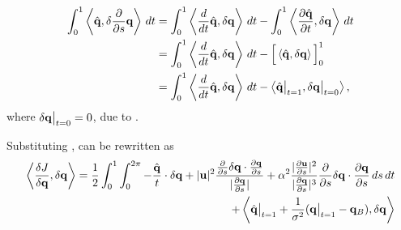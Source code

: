 \documentclass[a4paper, 12pt]{article}
\begin{document}
\begin{equation}
\begin{split}
  \label{eq:adjoint}
  \int^1_0\left\langle \hat{\mathbf{q}}, \delta \frac{\partial }{\partial s} \mathbf{q} \right\rangle\,dt &=  
  \int^1_0\left\langle \frac{d}{dt}\hat{\mathbf{q}}, \delta \mathbf{q} \right\rangle\,dt -  \int^1_0\left\langle \frac{\partial \hat{\mathbf{q}}}{\partial t}, \delta \mathbf{q}  \right\rangle\,dt  \\
  &= \int^1_0\left\langle \frac{d}{dt}\hat{\mathbf{q}}, \delta \mathbf{q} \right\rangle\,dt - \Big[\left\langle \hat{\mathbf{q}}, \delta \mathbf{q} \right\rangle\Big]^1_0  \\
  &= \int^1_0\left\langle \frac{d}{dt}\hat{\mathbf{q}}, \delta \mathbf{q} \right\rangle\,dt - \left\langle \hat{\mathbf{q}}\big|_{t=1}, \delta \mathbf{q}\big|_{t=0} \right\rangle,
\end{split}
\end{equation}
where $\delta \mathbf{q}\big|_{t=0} = 0$, due to .

Substituting ,  can be rewritten as 
\begin{equation}
\begin{split}
  \label{eq:dJdq-adjoint}
  \left\langle \frac{\delta J}{\delta \mathbf{q}}, \delta \mathbf{q} \right\rangle =
  \frac{1}{2}\int^1_0\int^{2\pi}_0 -\frac{\hat{\mathbf{q}}}{t}\cdot \delta \mathbf{q} + |\mathbf{u}|^2
  \frac{\frac{\partial }{\partial s}\delta \mathbf{q} \cdot \frac{\partial \mathbf{q}}{\partial s}}{|\frac{\partial \mathbf{q}}{\partial s}|}
    + \alpha^2 \frac{|\frac{\partial \mathbf{u}}{\partial s}|^2}{|\frac{\partial \mathbf{q}}{\partial s}|^3} \frac{\partial }{\partial s}\delta \mathbf{q} \cdot \frac{\partial \mathbf{q}}{\partial s} \,ds\,dt \\
    + \left\langle  \hat{\mathbf{q}} \big|_{t=1} + \frac{1}{\sigma^2}(\mathbf{q} \big|_{t=1} -
      \mathbf{q}_B), \delta \mathbf{q} \right\rangle
\end{split}
\end{equation}
\end{document}
